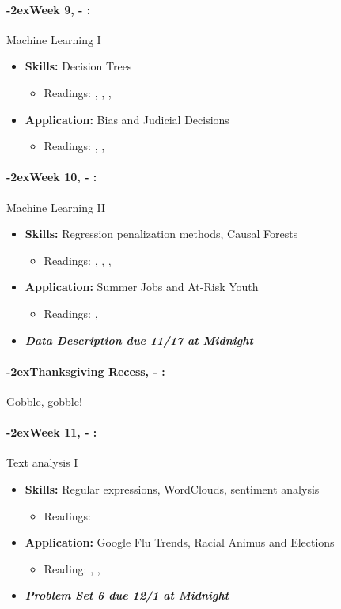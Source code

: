 \documentclass[11pt]{article}
\newcommand{\week}[1]{%
  \paragraph*{\kern-2ex\quad #1, \AdvanceDate[1]\syldate{\today} - \AdvanceDate[2]\syldate{\today}:}%
  \ifdim\wd1=\wd\MONDAY
    \AdvanceDate[7]
  \else
    \AdvanceDate[7]
  \fi%
}
\begin{document}
\week{Week 9} Machine Learning I
\begin{itemize}
  \item \textbf{Skills:} Decision Trees
  \begin{itemize}
    \item Readings: \textbf{\cite{athey2019machine}}, \textbf{\cite{varian2014bigdata}}, \cite{mullainathan2017machine}, \cite{kleinberg2015prediction}
  \end{itemize}
  \item \textbf{Application:} Bias and Judicial Decisions
  \begin{itemize}
    \item Readings: \textbf{\cite{kleinberg2018human}}, \cite{bertrand2004emily}, \cite{simonsohn2023bertrand}
  \end{itemize}
\end{itemize}
\week{Week 10} Machine Learning II
\begin{itemize}
  \item \textbf{Skills:} Regression penalization methods, Causal Forests
  \begin{itemize}
    \item Readings: \textbf{\cite{athey2019machine}}, \cite{varian2014bigdata}, \cite{mullainathan2017machine}, \cite{kleinberg2015prediction}
  \end{itemize}
  \item \textbf{Application:} Summer Jobs and At-Risk Youth
  \begin{itemize}
    \item Readings: \textbf{\cite{davis2017summer}}, \cite{naik2014streetscore}
  \end{itemize}
  \item \textit{\textbf{Data Description due 11/17 at Midnight}}
\end{itemize}
\week{Thanksgiving Recess} Gobble, gobble! 
\week{Week 11} Text analysis I
\begin{itemize}
  \item \textbf{Skills:} Regular expressions, WordClouds, sentiment analysis
  \begin{itemize}
    \item Readings: \textbf{\cite{gentzkow2019text}}
  \end{itemize}
  \item \textbf{Application:} Google Flu Trends, Racial Animus and Elections
  \begin{itemize}
    \item Reading: \textbf{\cite{lazer2014parable}}, \textbf{\cite{stephensdavidowitz2014racial}}, \cite{ginsberg2009influenza}
  \end{itemize}
  \item \textit{\textbf{Problem Set 6 due 12/1 at Midnight}}
\end{itemize}
\end{document}
